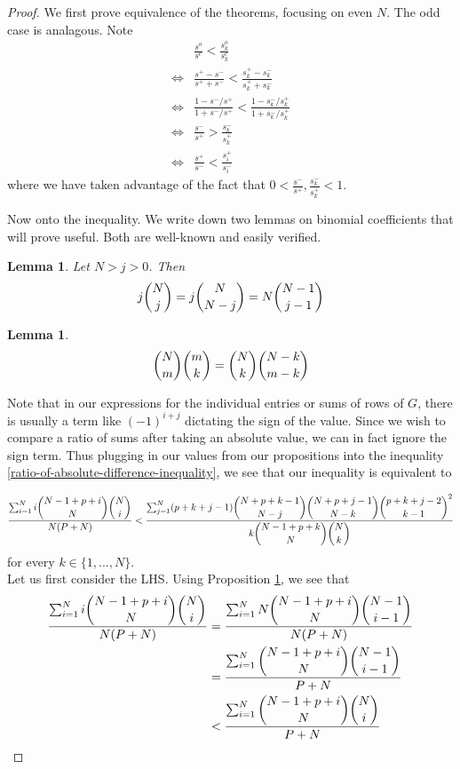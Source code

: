 \documentclass{article}
\newtheorem{lem}[thm]{Lemma}
\theoremstyle{definition}
\theoremstyle{remark}
\numberwithin{equation}{section}
\begin{document}
\begin{proof}
We first prove equivalence of the theorems, focusing on even $N$. The odd case is analagous. Note 
\begin{align*}
&\frac{s^o}{s^e} < \frac{s^o_k}{s^e_k} \\
\iff & \frac{s^+ - s^-}{s^+ +s^-} <\frac{s^+_k - s^-_k}{s^+_k +s^-_k} \\
\iff& \frac{1-s^-/s^+}{1+s^-/s^+} < \frac{1-s^-_k /s^+_k}{1+s^-_k/s^+_k} \\
\iff & \frac{s^-}{s^+} > \frac{s^-_k}{s^+_k}\\
\iff & \frac{s^+}{s^-} < \frac{s_i^+}{s_i^-}
\end{align*} where we have taken advantage of the fact that $0<\frac{s^-}{s^+}, \frac{s^-_k}{s^+_k}<1$.

Now onto the inequality. We write down two lemmas on binomial coefficients that will prove useful. Both are well-known and easily verified.
\begin{lem}\label{absorption-combination}
Let $N>j>0$. Then 
\[ j \dbinom{N}{j} = j \dbinom{N}{N-j} = N \dbinom{N-1}{j-1}\]
\end{lem} 

\begin{lem}\label{subset-of-a-subset-combination}
\[ \dbinom{N}{m} \dbinom{m}{k} = \dbinom{N}{k} \dbinom{N-k}{m-k} \]
\end{lem} 
\bigskip


Note that in our expressions for the individual entries or sums of rows of $G$, there is usually a term like $(-1)^{i+j}$ dictating the sign of the value. Since we wish to compare a ratio of sums after taking an absolute value, we can in fact ignore the sign term. Thus plugging in our values from our propositions into the inequality \ref{ratio-of-absolute-difference-inequality}, we see that our inequality is equivalent to 

\begin{equation}\label{inequality-all-expressions}
\frac{\sum_{i=1}^N i \dbinom{N-1+p+i}{N} \dbinom{N}{i}}{N(P+N)} < \frac{\sum_{j=1}^N (p+k+j-1) \dbinom{N+p+k-1}{N-j} \dbinom{N+p+j-1}{N-k} \dbinom{p+k+j-2}{k-1}^2 }{k \dbinom{N-1+p+k}{N}\dbinom{N}{k}} 
\end{equation}  for every $k\in \{ 1,...,N\}$.\\

Let us first consider the LHS. Using Proposition \ref{absorption-combination}, we see that 
\begin{align}
\frac{\sum_{i=1}^N i \dbinom{N-1+p+i}{N} \dbinom{N}{i}}{N(P+N)}  &= \frac{\sum_{i=1}^N N \dbinom{N-1+p+i}{N}  \dbinom{N-1}{i-1}}{N(P+N)} \\
&= \frac{\sum_{i=1}^N\dbinom{N-1+p+i}{N}  \dbinom{N-1}{i-1}}{P+N} \\
&< \frac{\sum_{i=1}^N\dbinom{N-1+p+i}{N}  \dbinom{N}{i}}{P+N} \label{LHS-upper-bound}
\end{align}


\end{proof}
\end{document}
